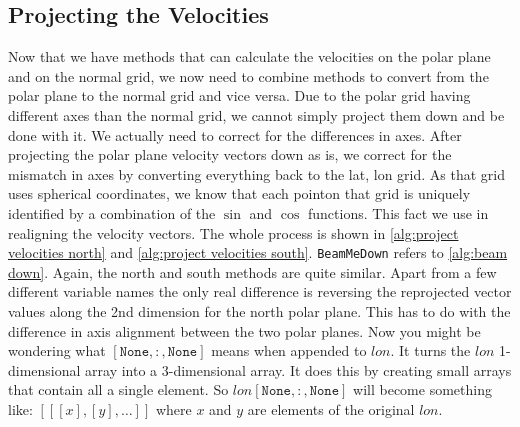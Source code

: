 \subsection{Projecting the Velocities}
Now that we have methods that can calculate the velocities on the polar plane and on the normal grid, we now need to combine methods to convert from the polar plane to the normal grid and vice 
versa. Due to the polar grid having different axes than the normal grid, we cannot simply project them down and be done with it. We actually need to correct for the differences in axes. After 
projecting the polar plane velocity vectors down as is, we correct for the mismatch in axes by converting everything back to the lat, lon grid. As that grid uses spherical coordinates, we know 
that each pointon that grid is uniquely identified by a combination of the $\sin$ and $\cos$ functions. This fact we use in realigning the velocity vectors. The whole process is shown in 
\autoref{alg:project velocities north} and \autoref{alg:project velocities south}. \texttt{BeamMeDown} refers to \autoref{alg:beam down}. Again, the north and south methods are quite similar. 
Apart from a few different variable names the only real difference is reversing the reprojected vector values along the 2nd dimension for the north polar plane. This has to do with the 
difference in axis alignment between the two polar planes. Now you might be wondering what $[\texttt{None}, :, \texttt{None}]$ means when appended to $lon$. It turns the $lon$ 1-dimensional 
array into a 3-dimensional array. It does this by creating small arrays that contain all a single element. So $lon[\texttt{None}, :, \texttt{None}]$ will become something like: 
$[[[x], [y], \dots]]$ where $x$ and $y$ are elements of the original $lon$.

